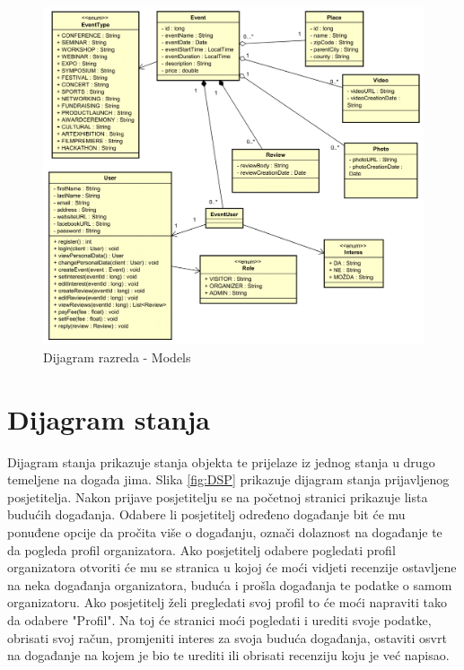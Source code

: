 			
		\begin{figure}[H]
			\includegraphics[width=\textwidth]{slike/DRM-1.PNG} %
			\caption{Dijagram razreda - Models}
			\label{fig:DRM} %
		\end{figure}
			
			
			\eject
		
		\section{Dijagram stanja}
			

			
			Dijagram stanja prikazuje stanja objekta te prijelaze iz jednog stanja u drugo temeljene na događa jima. Slika \ref{fig:DSP} prikazuje dijagram stanja prijavljenog posjetitelja. Nakon prijave posjetitelju se na početnoj stranici prikazuje lista budućih događanja. Odabere li posjetitelj određeno događanje bit će mu ponuđene opcije da pročita više o događanju, označi dolaznost na događanje te da pogleda profil organizatora. Ako posjetitelj odabere pogledati profil organizatora otvoriti će mu se stranica u kojoj će moći vidjeti recenzije ostavljene na neka događanja organizatora, buduća i prošla događanja te podatke o samom organizatoru. Ako posjetitelj želi pregledati svoj profil to će moći napraviti tako da odabere "Profil". Na toj će stranici moći pogledati i urediti svoje podatke, obrisati svoj račun, promjeniti interes za svoja buduća događanja, ostaviti osvrt na događanje na kojem je bio te urediti ili obrisati recenziju koju je već napisao.
			
